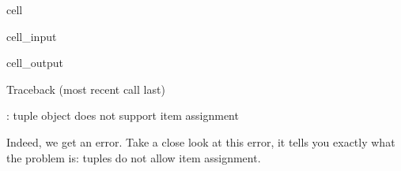 \documentclass[letterpaper,10pt,english]{jupyterBook}
\begin{document}
\begin{sphinxuseclass}{cell}\begin{sphinxVerbatimInput}

\begin{sphinxuseclass}{cell_input}
\begin{sphinxVerbatim}[commandchars=\\\{\}]
\PYG{p}{[}\PYG{p}{]}  
\end{sphinxVerbatim}

\end{sphinxuseclass}\end{sphinxVerbatimInput}
\begin{sphinxVerbatimOutput}

\begin{sphinxuseclass}{cell_output}
\begin{sphinxVerbatim}[commandchars=\\\{\}]
Traceback (most recent call last)
  
 \PYG{p}{[}\PYG{p}{]}  

: \PYGZsq{}tuple\PYGZsq{} object does not support item assignment
\end{sphinxVerbatim}

\end{sphinxuseclass}\end{sphinxVerbatimOutput}

\end{sphinxuseclass}
\sphinxAtStartPar
Indeed, we get an error. Take a close look at this error, it tells you exactly what the problem is: tuples do not allow item assignment.
\end{document}

